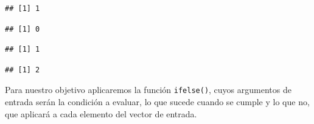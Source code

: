 \documentclass[11pt,]{book}
\newenvironment{Shaded}{\begin{snugshade}}{\end{snugshade}}
\newcommand{\CommentTok}[1]{\textcolor[rgb]{0.37,0.37,0.37}{\textit{#1}}}
\newcommand{\DecValTok}[1]{\textcolor[rgb]{0.06,0.06,0.06}{#1}}
\newcommand{\KeywordTok}[1]{\textcolor[rgb]{0.27,0.27,0.27}{\textbf{#1}}}
\newcommand{\NormalTok}[1]{#1}
\newcommand{\OperatorTok}[1]{\textcolor[rgb]{0.43,0.43,0.43}{\textbf{#1}}}
\newcommand{\StringTok}[1]{\textcolor[rgb]{0.5,0.5,0.5}{#1}}
\begin{document}
\begin{Shaded}
\end{Shaded}

\begin{verbatim}
## [1] 1
\end{verbatim}

\begin{Shaded}
\end{Shaded}

\begin{verbatim}
## [1] 0
\end{verbatim}

\begin{Shaded}
\end{Shaded}

\begin{verbatim}
## [1] 1
\end{verbatim}

\begin{Shaded}
\end{Shaded}

\begin{verbatim}
## [1] 2
\end{verbatim}

Para nuestro objetivo aplicaremos la función \texttt{ifelse()}, cuyos argumentos de entrada serán la condición a evaluar, lo que sucede cuando se cumple y lo que no, que aplicará a cada elemento del vector de entrada.

\begin{Shaded}
\end{Shaded}
\end{document}
